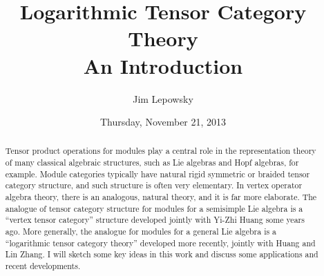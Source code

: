 \documentclass{UAmathtalk}
\author{Jim Lepowsky}
\title{Logarithmic Tensor Category Theory\\ An Introduction}
\date{Thursday, November 21, 2013}
\begin{document}
\maketitle

\begin{abstract}
Tensor product operations for modules play a central role in the representation theory of many classical algebraic structures, such as Lie algebras and Hopf algebras, for example.
Module categories typically have natural rigid symmetric or braided tensor category structure, and such structure is often very elementary.
In vertex operator algebra theory, there is an analogous, natural theory, and it is far more elaborate.
The analogue of tensor category structure for modules for a semisimple Lie algebra is a ``vertex tensor category'' structure developed jointly with Yi-Zhi Huang some years ago.
More generally, the analogue for modules for a general Lie algebra is a ``logarithmic tensor category theory'' developed more recently, jointly with Huang and Lin Zhang.
I will sketch some key ideas in this work and discuss some applications and recent developments.
\end{abstract}
\end{document}
